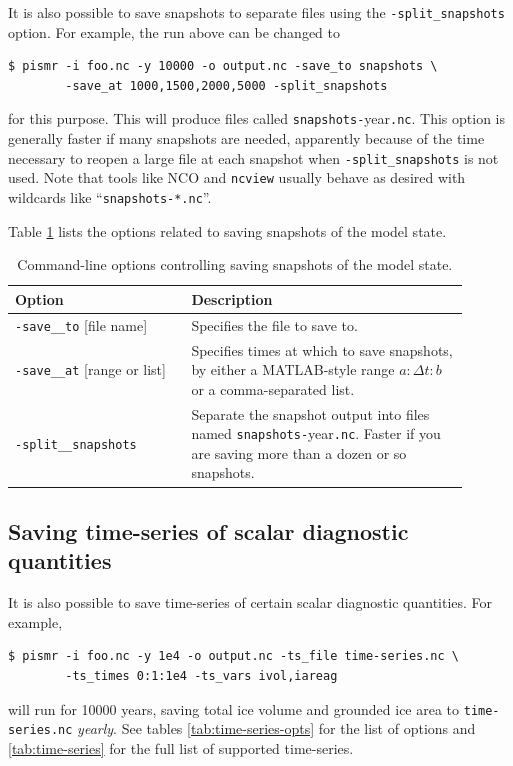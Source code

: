 \documentclass[11pt,final]{amsart}
\newcommand{\und}{\_\!\_}
\newcommand{\pismoptionindex}[1]{\index{options for PISM (and PETSc)!\texttt{-#1}}}
\newcommand{\intextoption}[1]{\texttt{-#1}\pismoptionindex{#1}}
\begin{document}
It is also possible to save snapshots to separate files using the
\verb|-split_snapshots| option.  For example, the run above can be changed to
\begin{verbatim}
$ pismr -i foo.nc -y 10000 -o output.nc -save_to snapshots \
        -save_at 1000,1500,2000,5000 -split_snapshots
\end{verbatim}
for this purpose.  This will produce files called \verb|snapshots-|year\verb|.nc|.  This option is generally faster if many snapshots are needed, apparently because of the time necessary to reopen a large file at each snapshot when \verb|-split_snapshots| is not used.  Note that tools like NCO and \verb|ncview| usually behave as desired with wildcards like ``\verb|snapshots-*.nc|''.

Table \ref{tab:snapshot-opts} lists the options related to saving snapshots of the model state.

\begin{table}[ht]
  \centering
  \caption{Command-line options controlling saving snapshots of the model state.}
  \begin{tabular}{p{0.35\linewidth}p{0.55\linewidth}}\hline
    \textbf{Option} & \textbf{Description} \\
    \hline
    \intextoption{save\und to} [file name] & Specifies the file to save to.\\
    \intextoption{save\und at} [range or list] & Specifies times at which to save snapshots, by either a MATLAB-style range $a:\Delta t:b$ or a comma-separated list. \\
    \intextoption{split\und snapshots} & Separate the snapshot output into files named \texttt{snapshots-}year\texttt{.nc}.  Faster if you are saving more than a dozen or so snapshots. \\
    \hline
  \end{tabular}
 \label{tab:snapshot-opts}
\end{table}


\subsection{Saving time-series of scalar diagnostic quantities}\index{time-series}
\label{sec:saving-time-series}
 It is also possible to save time-series of certain scalar diagnostic quantities.  For example,
\begin{verbatim}
$ pismr -i foo.nc -y 1e4 -o output.nc -ts_file time-series.nc \
        -ts_times 0:1:1e4 -ts_vars ivol,iareag
\end{verbatim} %
will run for 10000 years, saving total ice volume and grounded ice area to \texttt{time-series.nc} \emph{yearly}. See tables \ref{tab:time-series-opts} for the list of options and \ref{tab:time-series} for the full list of supported time-series.
\end{document}
